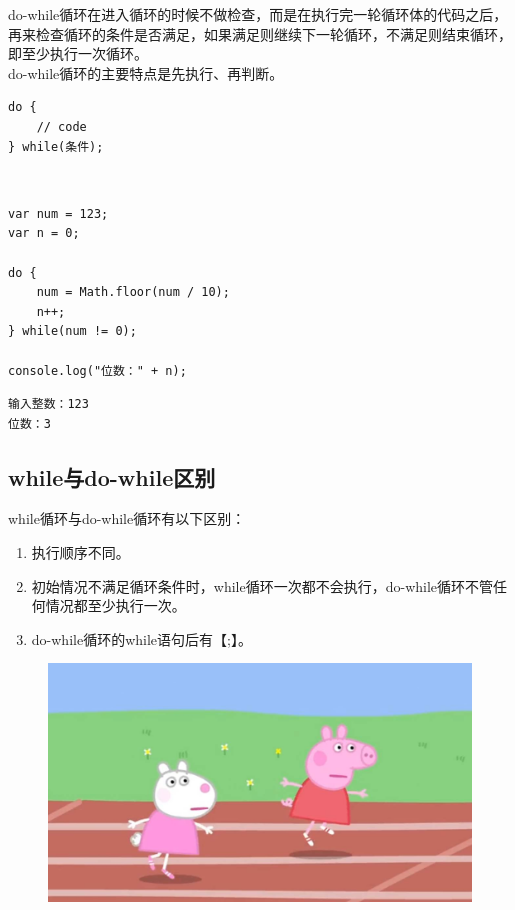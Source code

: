 do-while循环在进入循环的时候不做检查，而是在执行完一轮循环体的代码之后，再来检查循环的条件是否满足，如果满足则继续下一轮循环，不满足则结束循环，即至少执行一次循环。\\

do-while循环的主要特点是先执行、再判断。\\

\begin{lstlisting}[style=htmlcssjs]
do {
    // code
} while(条件);
\end{lstlisting}

\vspace{0.5cm}

\\

\begin{lstlisting}[style=htmlcssjs]
var num = 123;
var n = 0;

do {
    num = Math.floor(num / 10);
    n++;
} while(num != 0);

console.log("位数：" + n);
\end{lstlisting}

\begin{tcolorbox}
	\begin{verbatim}
输入整数：123
位数：3
	\end{verbatim}
\end{tcolorbox}

\vspace{0.5cm}

\subsection{while与do-while区别}

while循环与do-while循环有以下区别：

\begin{enumerate}
	\item 执行顺序不同。

	\item 初始情况不满足循环条件时，while循环一次都不会执行，do-while循环不管任何情况都至少执行一次。

	\item do-while循环的while语句后有【;】。
\end{enumerate}

\begin{figure}[H]
	\centering
	\includegraphics[scale=0.2]{img/C11/11-3/1.png}
\end{figure}

